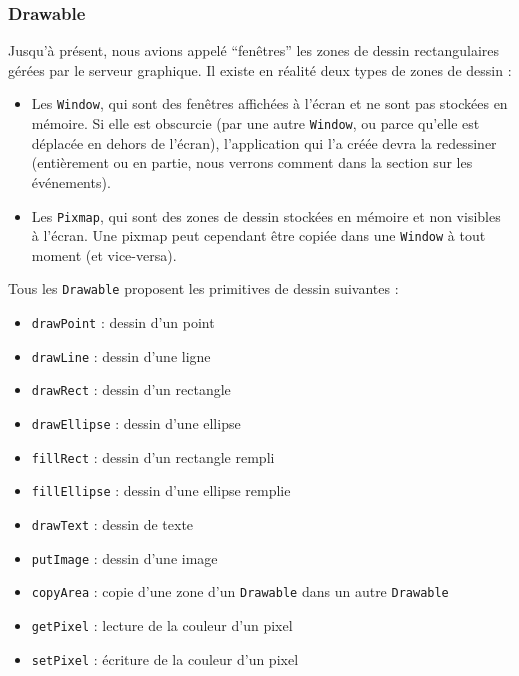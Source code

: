 \subsubsection{Drawable}

Jusqu'à présent, nous avions appelé ``fenêtres'' les zones de dessin rectangulaires gérées par le serveur graphique. Il existe en réalité deux types de zones de dessin :
\begin{itemize}
  \item Les \verb|Window|, qui sont des fenêtres affichées à l'écran et ne sont pas stockées en mémoire. Si elle est obscurcie (par une autre \verb|Window|, ou parce qu'elle est déplacée en dehors de l'écran), l'application qui l'a créée devra la redessiner (entièrement ou en partie, nous verrons comment dans la section sur les événements).
  \item Les \verb|Pixmap|, qui sont des zones de dessin stockées en mémoire et non visibles à l'écran. Une pixmap peut cependant être copiée dans une \verb|Window| à tout moment (et vice-versa).
\end{itemize}

\vspace{1em}

Tous les \verb|Drawable| proposent les primitives de dessin suivantes :
\begin{itemize}
  \item \verb|drawPoint| : dessin d'un point
  \item \verb|drawLine| : dessin d'une ligne
  \item \verb|drawRect| : dessin d'un rectangle
  \item \verb|drawEllipse| : dessin d'une ellipse
  \item \verb|fillRect| : dessin d'un rectangle rempli
  \item \verb|fillEllipse| : dessin d'une ellipse remplie
  \item \verb|drawText| : dessin de texte
  \item \verb|putImage| : dessin d'une image
  \item \verb|copyArea| : copie d'une zone d'un \verb|Drawable| dans un autre \verb|Drawable|
  \item \verb|getPixel| : lecture de la couleur d'un pixel
  \item \verb|setPixel| : écriture de la couleur d'un pixel
\end{itemize}

\vspace{1em}

